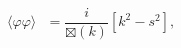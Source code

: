 \begin{equation}
\text{ }\langle\varphi\varphi\rangle\text{ }=\frac{i}{\boxtimes(k)}\left[
k^{2}-s^{2}\right]  , \label{Prop_phi}%
\end{equation}%
